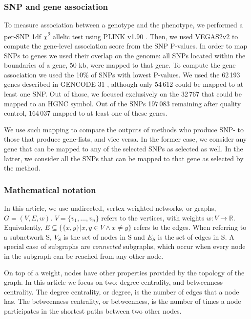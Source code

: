 \documentclass[twocolumn, 10pt]{article}
\begin{document}
\subsubsection{SNP and gene association}
\label{methods:node_score}
To measure association between a genotype and the phenotype, we performed a per-SNP 1df \(\chi\)\textsuperscript{2} allelic test using PLINK v1.90 \cite{chang_second-generation_2015}. Then, we used VEGAS2v2 to compute the gene-level association score \cite{mishra_vegas2:_2015} from the SNP P-values. In order to map SNPs to genes we used their overlap on the genome: all SNPs located within the boundaries of a gene, \textpm{} 50 kb, were mapped to that gene. To compute the gene association we used the 10\% of SNPs with lowest P-values. We used the 62\,193 genes described in GENCODE 31 \cite{frankish_gencode_2019}, although only 54\,612 could be mapped to at least one SNP. Out of those, we focused exclusively on the 32\,767 that could be mapped to an HGNC symbol. Out of the SNPs 197\,083 remaining after quality control, 164\,037 mapped to at least one of these genes. 

We use such mapping to compare the outputs of methods who produce SNP- to those that produce gene-lists, and vice versa. In the former case, we consider any gene that can be mapped to any of the selected SNPs as selected as well. In the latter, we consider all the SNPs that can be mapped to that gene as selected by the method.

\subsubsection{Mathematical notation}
\label{methods:notation}
In this article, we use undirected, vertex-weighted networks, or graphs, $G = (V,E,w)$. $V = \{v_{1}, \dots{}, v_{n}\}$ refers to the vertices, with weights $w: V \rightarrow \mathbb{R}$. Equivalently, $E \subseteq \{\{x,y\} | x,y \in V \wedge x \neq y\}$ refers to the edges. When referring to a subnetwork S, $V_{S}$ is the set of nodes in S and $E_{S}$ is the set of edges in S. A special case of subgraphs are \emph{connected} subgraphs, which occur when every node in the subgraph can be reached from any other node.

On top of a weight, nodes have other properties provided by the topology of the graph. In this article we focus on two: degree centrality, and betweenness centrality. The degree centrality, or degree, is the number of edges that a node has. The betweenness centrality, or betweenness, is the number of times a node participates in the shortest paths between two other nodes.
\end{document}
